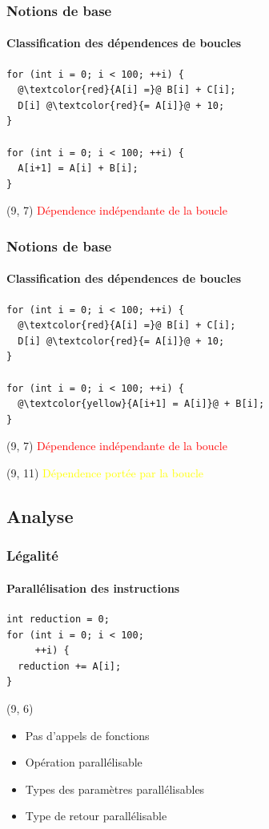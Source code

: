 \documentclass{beamer}
\begin{document}
\begin{frame}[fragile]
\frametitle{Notions de base}
\framesubtitle{Classification des dépendences de boucles}
\begin{lstlisting}
for (int i = 0; i < 100; ++i) {
  @\textcolor{red}{A[i] =}@ B[i] + C[i];
  D[i] @\textcolor{red}{= A[i]}@ + 10;
}

for (int i = 0; i < 100; ++i) {
  A[i+1] = A[i] + B[i];
}
\end{lstlisting}

\begin{textblock}{5.5}(9, 7)
	\textcolor{red}{Dépendence indépendante de la boucle}
\end{textblock}
\end{frame}

\begin{frame}[fragile]
\frametitle{Notions de base}
\framesubtitle{Classification des dépendences de boucles}
\begin{lstlisting}
for (int i = 0; i < 100; ++i) {
  @\textcolor{red}{A[i] =}@ B[i] + C[i];
  D[i] @\textcolor{red}{= A[i]}@ + 10;
}

for (int i = 0; i < 100; ++i) {
  @\textcolor{yellow}{A[i+1] = A[i]}@ + B[i];
}
\end{lstlisting}

\begin{textblock}{5.5}(9, 7)
	\textcolor{red}{Dépendence indépendante de la boucle}
\end{textblock}

\begin{textblock}{5}(9, 11)
	\textcolor{yellow}{Dépendence portée par la boucle}
\end{textblock}
\end{frame}

\subsection{Analyse}
\begin{frame}[fragile]
\frametitle{Légalité}
\framesubtitle{Parallélisation des instructions}
\begin{lstlisting}
int reduction = 0;
for (int i = 0; i < 100;
     ++i) {
  reduction += A[i];
}
\end{lstlisting}

\begin{textblock}{6}(9, 6)
	\begin{itemize}
	\item<2->[\checkmark] Pas d'appels de fonctions
	\item<3->[\checkmark] Opération parallélisable
	\item<4->[\checkmark] Types des paramètres parallélisables
	\item<5->[\checkmark] Type de retour parallélisable
	\end{itemize}
\end{textblock}
\end{frame}
\end{document}

